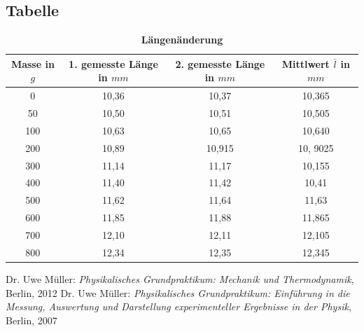 \documentclass[a4paper,11pt]{article}
\begin{document}
\subsection{Tabelle}
\begin{table}[ht] \centering \caption {\bf Längenänderung}	
\begin{tabular}{c|c|c|c|}
Masse in $g$ & 1. gemesste Länge in $mm$ & 2. gemesste Länge in $mm$ & Mittlwert $\overline l$ in $mm$ \\ \hline
0 & 10,36 & 10,37 & 10,365\\
50 & 10,50 & 10,51 & 10,505\\
100 & 10,63 & 10,65 & 10,640\\
200 & 10,89 & 10,915 & 10, 9025\\
300 & 11,14 & 11,17 & 10,155\\
400 & 11,40 & 11,42 & 10,41\\
500 & 11,62 & 11,64 & 11,63\\
600 & 11,85 & 11,88 & 11,865\\
700 & 12,10 & 12,11 & 12,105\\
800 & 12,34 & 12,35 & 12,345
\end{tabular}
\end{table}
	

	\begin{thebibliography}{1}
		Dr. Uwe Müller: \textit{Physikalisches Grundpraktikum: Mechanik und Thermodynamik}, Berlin, 2012
		Dr. Uwe Müller: \textit{Physikalisches Grundpraktikum: Einführung in die Messung, Auswertung und Darstellung experimenteller Ergebnisse in der Physik}, Berlin, 2007
	\end{thebibliography}
\end{document}
